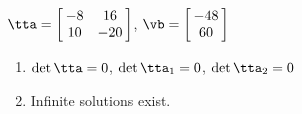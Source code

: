 {$\tta = \left[\hskip -3pt \begin{array}{cc} -8&16\\  10&-20\end {array} \hskip -3pt
 \right]$,
 \quad
$\vb = \left[\hskip -3pt \begin{array}{c} -48\\  60\end {array} \hskip -3pt
 \right]$}
{\begin{enumerate}
\item	$\det{\tta} = 0$, $\det{\tta_1} = 0$, $\det{\tta_2} = 0$
\item Infinite solutions exist.
\end{enumerate}
}
 


